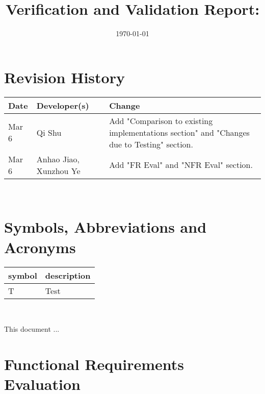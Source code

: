 \documentclass[12pt, titlepage]{article}
\begin{document}
\title{Verification and Validation Report: \progname} 
\author{\authname}
\date{\today}
	
\maketitle


\section{Revision History}

\begin{tabularx}{\textwidth}{llX}
  \toprule {\bf Date} & {\bf Developer(s)} & {\bf Change} \\
  \midrule  
Mar 6 & Qi Shu & Add "Comparison to existing implementations section" and "Changes due to Testing" section.\\
Mar 6 & Anhao Jiao, Xunzhou Ye & Add "FR Eval" and "NFR Eval" section.\\
\bottomrule
\end{tabularx}

~\newpage

\section{Symbols, Abbreviations and Acronyms}

\renewcommand{\arraystretch}{1.2}
\begin{tabular}{l l} 
  \toprule		
  \textbf{symbol} & \textbf{description}\\
  \midrule 
  T & Test\\
  \bottomrule
\end{tabular}\\


\newpage

\tableofcontents

\listoftables %

\listoffigures %

\newpage


This document ...

\section{Functional Requirements Evaluation}
\end{document}
